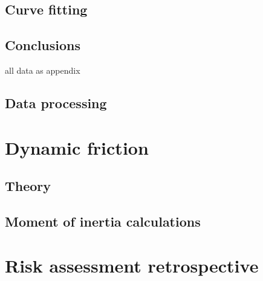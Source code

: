 \documentclass[12pt]{article}
\begin{document}
\subsection{Curve fitting}
\subsection{Conclusions}





all data as appendix 

\subsection{Data processing}

\section{Dynamic friction}



\subsection{Theory}

\subsection{Moment of inertia calculations}






\section{Risk assessment retrospective}

\printbibliography
\end{document}
